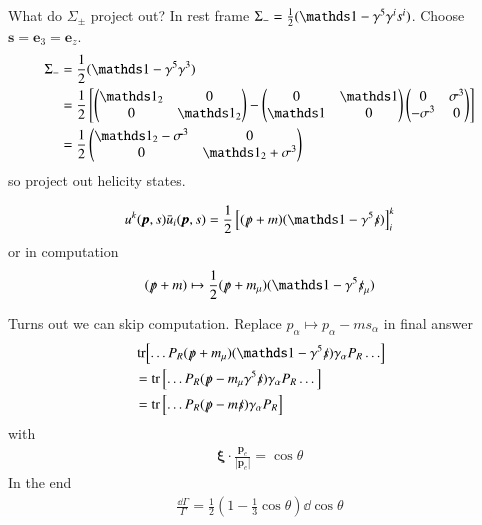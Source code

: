 What do $\Sigma_\pm$ project out? In rest frame $\Sigma_- = \frac{1}{2} (\id - \gamma^5 \gamma^i s^i)$. Choose $\pmb{s} = \pmb{e}_3 = \pmb{e}_z$. 
\begin{align*}
   \Sigma_- &= \frac{1}{2} (\id - \gamma^5 \gamma^3) \\
            &= \frac{1}{2} \left[ \begin{pmatrix} \id_2 & 0 \\ 0 & \id_2\end{pmatrix}  - \begin{pmatrix} 0 &\id \\ \id & 0 \end{pmatrix} \begin{pmatrix} 0 & \sigma^3 \\ -\sigma^3 & 0 \end{pmatrix}\right] \\
            &= \frac{1}{2} \begin{pmatrix} \id_2 - \sigma^3 & 0 \\ 0 & \id_2 + \sigma^3 \end{pmatrix}
\end{align*}
so project out helicity states.

\begin{align}
   u^k(\pmb{p},s) \bar{u}_i ( \pmb{p}, s) = \frac{1}{2} \left[ (\slashed{p}+ m) (\id - \gamma^5 \slashed{s}) \right]_i^k
\end{align}
or in computation
\begin{align}
   (\slashed{p} + m ) \mapsto \frac{1}{2} (\slashed{p} + m_\mu) (\id - \gamma^5 \slashed{s}_\mu)
\end{align}

Turns out we can skip computation. Replace $p_\alpha \mapsto p_\alpha- m s_\alpha$ in final answer
\begin{align*}
   &\tr[\dots P_R (\slashed{p} + m_\mu) (\id -\gamma^5 \slashed{s}) \gamma_\alpha P_R \dots ] \\
   &= \tr \left[ \dots P_R (\slashed{p} - m_\mu \gamma^5 \slashed{s}) \gamma_\alpha P_R \dots \right] \\
   &= \tr \left[ \dots P_R (\slashed{p} - m \slashed{s}) \gamma_\alpha P_R \right]
\end{align*}
with
\begin{align*}
   \pmb{\xi} \cdot \frac{\pmb{p}_e}{|\pmb{p}_e|} = \cos \theta
\end{align*}
In the end
\begin{align}
   \frac{\dd{\Gamma}}{\Gamma} = \frac{1}{2} \left(1-\frac{1}{3}\cos \theta \right) \dd{\cos \theta}
\end{align}

